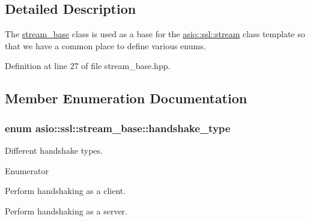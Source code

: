 \subsection{Detailed Description}
The \hyperlink{classasio_1_1ssl_1_1stream__base}{stream\+\_\+base} class is used as a base for the \hyperlink{classasio_1_1ssl_1_1stream}{asio\+::ssl\+::stream} class template so that we have a common place to define various enums. 

Definition at line 27 of file stream\+\_\+base.\+hpp.



\subsection{Member Enumeration Documentation}
\hypertarget{classasio_1_1ssl_1_1stream__base_a2f18813d3860bc8aee99249834d7c320}{}
\subsubsection[{handshake\+\_\+type}]{\setlength{\rightskip}{0pt plus 5cm}enum {\bf asio\+::ssl\+::stream\+\_\+base\+::handshake\+\_\+type}}\label{classasio_1_1ssl_1_1stream__base_a2f18813d3860bc8aee99249834d7c320}


Different handshake types. 

\begin{Desc}
\item[Enumerator]\par
\begin{description}
\item[{\em 
\hypertarget{classasio_1_1ssl_1_1stream__base_a2f18813d3860bc8aee99249834d7c320a68134fb041cb11ffe46e248ed1e1d73f}{}client\label{classasio_1_1ssl_1_1stream__base_a2f18813d3860bc8aee99249834d7c320a68134fb041cb11ffe46e248ed1e1d73f}
}]Perform handshaking as a client. \item[{\em 
\hypertarget{classasio_1_1ssl_1_1stream__base_a2f18813d3860bc8aee99249834d7c320a2f9bac13b8adb5945e7436945061d090}{}server\label{classasio_1_1ssl_1_1stream__base_a2f18813d3860bc8aee99249834d7c320a2f9bac13b8adb5945e7436945061d090}
}]Perform handshaking as a server. \end{description}
\end{Desc}


